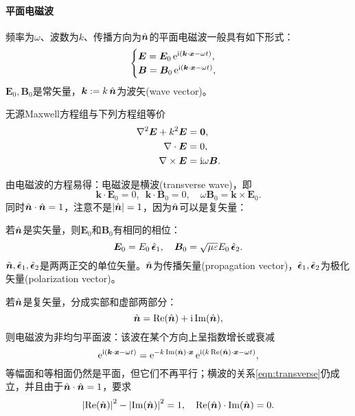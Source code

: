 \paragraph{平面电磁波}
频率为$\omega$、波数为$k$、传播方向为$\mathop{}\!\hat{\bm{n}}$的平面电磁波一般具有如下形式：
\begin{equation}
    \begin{cases}
        \bm E=\bm E_0\mathop{}\!\mathrm{e}^{\mathrm{i}(\bm k\cdot\bm x-\omega t)},\\
        \bm B=\bm B_0\mathop{}\!\mathrm{e}^{\mathrm{i}(\bm k\cdot\bm x-\omega t)},
    \end{cases}
\end{equation}
$\bm E_0,\bm B_0$是常矢量，$\bm k:=k\mathop{}\!\hat{\bm{n}}$为波矢(wave vector)。
\begin{example}{}{}
    无源Maxwell方程组与下列方程组等价
    \begin{align*}
        \nabla^2\bm E+k^2\bm E&=\bm 0,\\
        \nabla\cdot\bm E&=0,\\
        \nabla\times\bm E&=\mathrm{i}\omega\bm B.
    \end{align*}
\end{example}
由电磁波的方程易得：电磁波是横波(transverse wave)，即
\begin{equation}
    \label{eqn:transverse}
    \bm k\cdot\bm E_0=0,\enspace\bm k\cdot\bm B_0=0,\quad\omega\bm B_0=\bm k\times\bm E_0.
\end{equation}
同时$\mathop{}\!\hat{\bm{n}}\cdot\mathop{}\!\hat{\bm{n}}=1$，注意不是$\left\lvert\mathop{}\!\hat{\bm{n}}\right\rvert=1$，因为$\mathop{}\!\hat{\bm{n}}$可以是复矢量：
\begin{compactitem}
	\item 若$\mathop{}\!\hat{\bm{n}}$是实矢量，则$\bm E_0$和$\bm B_0$有相同的相位：
    \begin{equation}
        \bm E_0=E_0\mathop{}\!\hat{\bm{\epsilon}}_1,\quad \bm B_0=\sqrt{\mu\varepsilon}E_0\mathop{}\!\hat{\bm{\epsilon}}_2.
    \end{equation}
    $\mathop{}\!\hat{\bm{n}},\mathop{}\!\hat{\bm{\epsilon}}_1,\mathop{}\!\hat{\bm{\epsilon}}_2$是两两正交的单位矢量。$\mathop{}\!\hat{\bm{n}}$为传播矢量(propagation vector)，$\mathop{}\!\hat{\bm{\epsilon}}_1,\mathop{}\!\hat{\bm{\epsilon}}_2$为极化矢量(polarization vector)。
	\item 若$\mathop{}\!\hat{\bm{n}}$是复矢量，分成实部和虚部两部分：
    \[
        \mathop{}\!\hat{\bm{n}}=\operatorname{Re}(\mathop{}\!\hat{\bm{n}})+\mathrm{i}\operatorname{Im}(\mathop{}\!\hat{\bm{n}}),
    \]
    则电磁波为非均匀平面波：该波在某个方向上呈指数增长或衰减
    \[
        \mathop{}\!\mathrm{e}^{\mathrm{i}(\bm k\cdot\bm x-\omega t)}=\mathop{}\!\mathrm{e}^{-k\operatorname{Im}(\mathop{}\!\hat{\bm{n}})\cdot\bm x}\mathop{}\!\mathrm{e}^{\mathrm{i}(k\operatorname{Re}(\mathop{}\!\hat{\bm{n}})\cdot\bm x-\omega t)},
    \]
    等幅面和等相面仍然是平面，但它们不再平行；横波的关系\eqref{eqn:transverse}仍成立，并且由于$\mathop{}\!\hat{\bm{n}}\cdot\mathop{}\!\hat{\bm{n}}=1$，要求
    \[
        \left\lvert\operatorname{Re}(\mathop{}\!\hat{\bm{n}})\right\rvert^2-\left\lvert\operatorname{Im}(\mathop{}\!\hat{\bm{n}})\right\rvert^2=1,\quad \operatorname{Re}(\mathop{}\!\hat{\bm{n}})\cdot\operatorname{Im}(\mathop{}\!\hat{\bm{n}})=0.
    \]
\end{compactitem}
